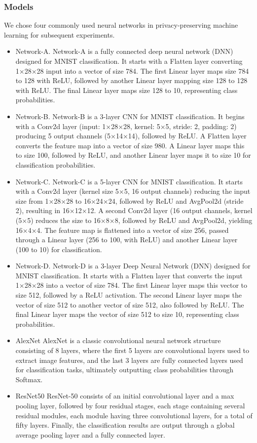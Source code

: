\documentclass[conference]{IEEEtran}
\begin{document}
\subsubsection{Models}
We chose four commonly used neural networks in privacy-preserving machine learning \cite{liu2024pencilprivateextensiblecollaborative} for subsequent experiments.

\begin{itemize}
    \item Network-A.
    Network-A is a fully connected deep neural network (DNN) designed for MNIST classification. It starts with a Flatten layer converting 1×28×28 input into a vector of size 784. The first Linear layer maps size 784 to 128 with ReLU, followed by another Linear layer mapping size 128 to 128 with ReLU. The final Linear layer maps size 128 to 10, representing class probabilities.
    \item Network-B.
    Network-B is a 3-layer CNN for MNIST classification. It begins with a Conv2d layer (input: 1×28×28, kernel: 5×5, stride: 2, padding: 2) producing 5 output channels (5×14×14), followed by ReLU. A Flatten layer converts the feature map into a vector of size 980. A Linear layer maps this to size 100, followed by ReLU, and another Linear layer maps it to size 10 for classification probabilities.
    \item Network-C.
    Network-C is a 5-layer CNN for MNIST classification. It starts with a Conv2d layer (kernel size 5×5, 16 output channels) reducing the input size from 1×28×28 to 16×24×24, followed by ReLU and AvgPool2d (stride 2), resulting in 16×12×12. A second Conv2d layer (16 output channels, kernel (5×5) reduces the size to 16×8×8, followed by ReLU and AvgPool2d, yielding 16×4×4. The feature map is flattened into a vector of size 256, passed through a Linear layer (256 to 100, with ReLU) and another Linear layer (100 to 10) for classification.
    \item Network-D.
    Network-D is a 3-layer Deep Neural Network (DNN) designed for MNIST classification. It starts with a Flatten layer that converts the input 1×28×28 into a vector of size 784. The first Linear layer maps this vector to size 512, followed by a ReLU activation. The second Linear layer maps the vector of size 512 to another vector of size 512, also followed by ReLU. The final Linear layer maps the vector of size 512 to size 10, representing class probabilities.
    \item AlexNet
    AlexNet is a classic convolutional neural network structure consisting of 8 layers, where the first 5 layers are convolutional layers used to extract image features, and the last 3 layers are fully connected layers used for classification tasks, ultimately outputting class probabilities through Softmax.
    \item ResNet50
    ResNet-50 consists of an initial convolutional layer and a max pooling layer, followed by four residual stages, each stage containing several residual modules, each module having three convolutional layers, for a total of fifty layers. Finally, the classification results are output through a global average pooling layer and a fully connected layer.
    
\end{itemize}
\end{document}
